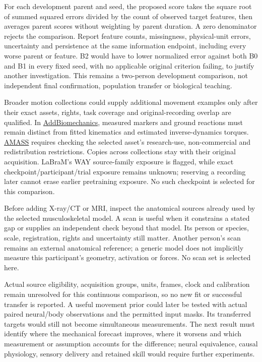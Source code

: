 For each development parent and seed, the proposed score takes the square root of summed squared errors divided by the count of observed target features, then averages parent scores without weighting by parent duration. A zero denominator rejects the comparison. Report feature counts, missingness, physical-unit errors, uncertainty and persistence at the same information endpoint, including every worse parent or feature. B2 would have to lower normalized error against both B0 and B1 in every fixed seed, with no applicable original criterion failing, to justify another investigation. This remains a two-person development comparison, not independent final confirmation, population transfer or biological teaching.

Broader motion collections could supply additional movement examples only after their exact assets, rights, task coverage and original-recording overlap are qualified. In \href{https://www.addbiomechanics.org/download_data.html}{AddBiomechanics}, measured markers and ground reactions must remain distinct from fitted kinematics and estimated inverse-dynamics torques. \href{https://amass.is.tue.mpg.de/license.html}{AMASS} requires checking the selected asset's research-use, non-commercial and redistribution restrictions. Copies across collections stay with their original acquisition. LaBraM's WAY source-family exposure is flagged, while exact checkpoint/participant/trial exposure remains unknown; reserving a recording later cannot erase earlier pretraining exposure. No such checkpoint is selected for this comparison.

Before adding X-ray/CT or MRI, inspect the anatomical sources already used by the selected musculoskeletal model. A scan is useful when it constrains a stated gap or supplies an independent check beyond that model. Its person or species, scale, registration, rights and uncertainty still matter. Another person's scan remains an external anatomical reference; a generic model does not implicitly measure this participant's geometry, activation or forces. No scan set is selected here.

Actual source eligibility, acquisition groups, units, frames, clock and calibration remain unresolved for this continuous comparison, so no new fit or successful transfer is reported. A useful movement prior could later be tested with actual paired neural/body observations and the permitted input masks. Its transferred targets would still not become simultaneous measurements. The next result must identify where the mechanical forecast improves, where it worsens and which measurement or assumption accounts for the difference; neural equivalence, causal physiology, sensory delivery and retained skill would require further experiments.

